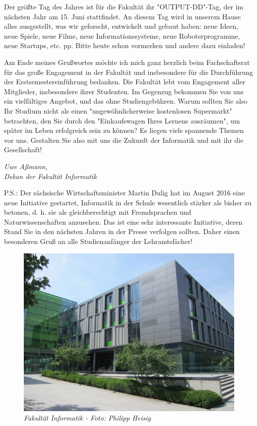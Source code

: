 Der größte Tag des Jahres ist für die Fakultät ihr "OUTPUT-DD"-Tag, der im nächsten Jahr am 15. Juni stattfindet. An diesem Tag wird in unserem Hause alles ausgestellt, was wir geforscht, entwickelt und gebaut haben: neue Ideen, neue Spiele, neue Filme, neue Informationssysteme, neue Roboterprogramme, neue Startups, etc. pp. Bitte heute schon vormerken und andere dazu einladen!

Am Ende meines Grußwortes möchte ich mich ganz herzlich beim Fachschaftsrat für das große Engagement in der Fakultät und insbesondere für die Durchführung der Erstsemestereinführung bedanken. Die Fakultät lebt vom Engagement aller Mitglieder, insbesondere ihrer Studenten. Im Gegenzug bekommen Sie von uns ein vielfältiges Angebot, und das ohne Studiengebühren. Warum sollten Sie also Ihr Studium nicht als einen "ungewöhnlicherweise kostenlosen Supermarkt" betrachten, den Sie durch den "Einkaufswagen Ihres Lernens ausräumen", um später im Leben erfolgreich sein zu können? Es liegen viele spannende Themen vor uns. Gestalten Sie also mit uns die Zukunft der Informatik und mit ihr die Gesellschaft!

\textit{Uwe Aßmann,\\
Dekan der Fakultät Informatik}

P.S.: Der sächsische Wirtschaftsminister Martin Dulig hat im August 2016 eine neue Initiative gestartet, Informatik in der Schule wesentlich stärker als bisher zu betonen, d. h. sie als gleichberechtigt mit Fremdsprachen und Naturwissenschaften anzusehen. Das ist eine sehr interessante Initiative, deren Stand Sie in den nächsten Jahren in der Presse verfolgen sollten. Daher einen besonderen Gruß an alle Studienanfänger der Lehramtsfächer!

\vfill

\begin{figure}[h!]
\centering
\includegraphics[width=.9\linewidth]{img/fakultaet.jpg}
\caption*{\small \textit{Fakultät Informatik - Foto: Philipp Heisig}}
\end{figure}
